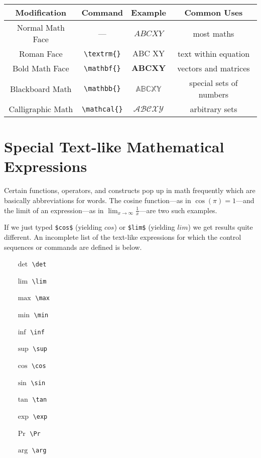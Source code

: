 \begin{center}

  \begin{tabular}{c c c c}
    \hline \hline
    Modification & Command & Example & Common Uses\\
    \hline
    Normal Math Face & ---& $ABC XY$ & most maths\\
    Roman Face & \texttt{\textbackslash textrm\{\}} &  $\textrm{ABC XY}$& text within equation\\
    Bold Math Face & \texttt{\textbackslash mathbf\{\}} &  $\mathbf{ABC XY}$ & vectors and matrices\\
    Blackboard Math & \texttt{\textbackslash mathbb\{\}} &  $\mathbb{ABC XY}$ & special sets of numbers\\
    Calligraphic Math & \texttt{\textbackslash mathcal\{\}} & $\mathcal{ABC XY}$& arbitrary sets\\
    \hline \hline
  \end{tabular}

\end{center}

\section{Special Text-like Mathematical Expressions}

Certain functions, operators, and constructs pop up in math frequently which are
basically abbreviations for words. The cosine function---as in
$\cos(\pi)=1$---and the limit of an expression---as in $\lim_{x \rightarrow
  \infty} \frac{1}{x}$---are two such examples.

If we just typed \verb=$cos$= (yielding $cos$) or \verb=$lim$= (yielding $lim$) we get results
quite different. An incomplete list of the text-like expressions for which the
control sequences or commands are defined is below.

\begin{multicols}{4}
  \begin{itemize}
  \item[$\det$] \texttt{\textbackslash det}
  \item[$\lim$] \texttt{\textbackslash lim}
  \item[$\max$] \texttt{\textbackslash max}
  \item[$\min$] \texttt{\textbackslash min}
  \item[$\inf$] \texttt{\textbackslash inf}
  \item[$\sup$] \texttt{\textbackslash sup}
  \item[$\cos$] \texttt{\textbackslash cos}
  \item[$\sin$] \texttt{\textbackslash sin}
  \item[$\tan$] \texttt{\textbackslash tan}
  \item[$\exp$] \texttt{\textbackslash exp}
  \item[$\Pr$] \texttt{\textbackslash Pr}
  \item[$\arg$] \texttt{\textbackslash arg}
  \end{itemize}
\end{multicols}

